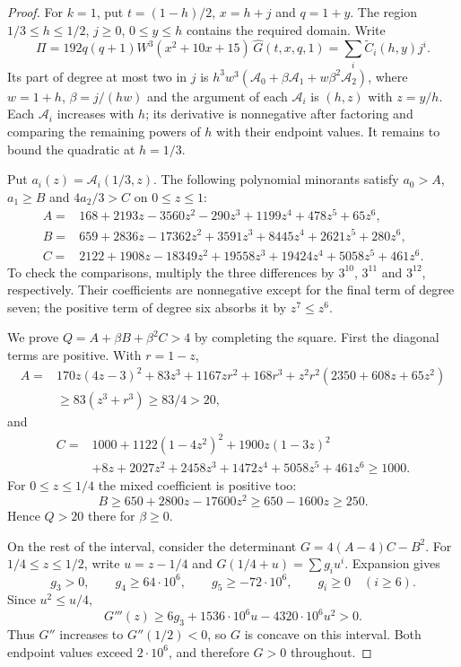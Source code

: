\begin{proof}
For $k=1$, put $t=(1-h)/2$, $x=h+j$ and $q=1+y$.
The region $1/3\le h\le1/2$, $j\ge0$, $0\le y\le h$ contains the required domain.
Write
\[
 \Pi=192q(q+1)W^3(x^2+10x+15)\,\widehat G(t,x,q,1)
     =\sum_i\widetilde C_i(h,y)j^i.
\]
Its part of degree at most two in $j$ is
$h^3w^3(\mathcal A_0+\beta\mathcal A_1+w\beta^2\mathcal A_2)$,
where $w=1+h$, $\beta=j/(hw)$ and the argument of each $\mathcal A_i$ is $(h,z)$ with $z=y/h$.
Each $\mathcal A_i$ increases with $h$; its derivative is nonnegative after
factoring and comparing the remaining powers of $h$ with their endpoint values.
It remains to bound the quadratic at $h=1/3$.

Put $a_i(z)=\mathcal A_i(1/3,z)$. The following polynomial minorants satisfy
$a_0>A$, $a_1\ge B$ and $4a_2/3>C$ on $0\le z\le1$:
\begin{align*}
 A={}&168+2193z-3560z^2-290z^3+1199z^4+478z^5+65z^6,\\
 B={}&659+2836z-17362z^2+3591z^3+8445z^4+2621z^5+280z^6,\\
 C={}&2122+1908z-18349z^2+19558z^3+19424z^4+5058z^5+461z^6.
\end{align*}
To check the comparisons, multiply the three differences by $3^{10}$, $3^{11}$ and $3^{12}$,
respectively. Their coefficients are nonnegative except for the final term of degree seven;
the positive term of degree six absorbs it by $z^7\le z^6$.

We prove $Q=A+\beta B+\beta^2C>4$ by completing the square.
First the diagonal terms are positive. With $r=1-z$,
\begin{align*}
 A={}&170z(4z-3)^2+83z^3+1167zr^2+168r^3
                      +z^2r^2(2350+608z+65z^2)\\
   &\ge83(z^3+r^3)\ge83/4>20,
\end{align*}
and
\begin{align*}
 C={}&1000+1122(1-4z^2)^2+1900z(1-3z)^2\\
     &+8z+2027z^2+2458z^3+1472z^4+5058z^5+461z^6\ge1000.
\end{align*}
For $0\le z\le1/4$ the mixed coefficient is positive too:
\[
 B\ge650+2800z-17600z^2\ge650-1600z\ge250.
\]
Hence $Q>20$ there for $\beta\ge0$.

On the rest of the interval, consider the determinant
$G=4(A-4)C-B^2$.
For $1/4\le z\le1/2$, write $u=z-1/4$ and
$G(1/4+u)=\sum g_i u^i$. Expansion gives
\[
 g_3>0,\qquad g_4\ge64\cdot10^6,\qquad
 g_5\ge-72\cdot10^6,\qquad g_i\ge0\quad(i\ge6).
\]
Since $u^2\le u/4$,
\[
 G'''(z)\ge6g_3+1536\cdot10^6u-4320\cdot10^6u^2>0.
\]
Thus $G''$ increases to $G''(1/2)<0$, so $G$ is concave on this interval.
Both endpoint values exceed $2\cdot10^6$, and therefore $G>0$ throughout.


\end{proof}
